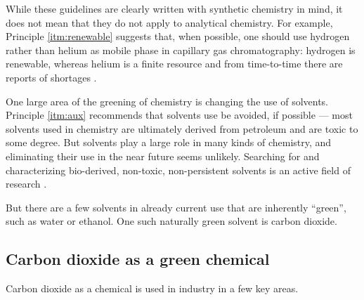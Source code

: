 While these guidelines are clearly written with synthetic chemistry in mind, it
does not mean that they do not apply to analytical chemistry. For example,
Principle \ref{itm:renewable} suggests that, when possible, one should use
hydrogen rather than helium as mobile phase in capillary gas chromatography:
hydrogen is renewable, whereas helium is a finite resource and from time-to-time
there are reports of shortages \autocite{Kornblut2019}.

One large area of the greening of chemistry is changing the use of solvents.
Principle \ref{itm:aux} recommends that solvents use be avoided, if possible ---
most solvents used in chemistry are ultimately derived from petroleum and are
toxic to some degree. But solvents play a large role in many kinds of chemistry,
and eliminating their use in the near future seems unlikely. Searching for and
characterizing bio-derived, non-toxic, non-persistent solvents is an active
field of research \autocite{Clarke2018}.


But there are a few solvents in already current use that are inherently
``green'', such as water or ethanol. One such naturally green solvent is carbon
dioxide.
 

\subsection{Carbon dioxide as a green chemical}

Carbon dioxide as a chemical is used in industry in a few key areas.

